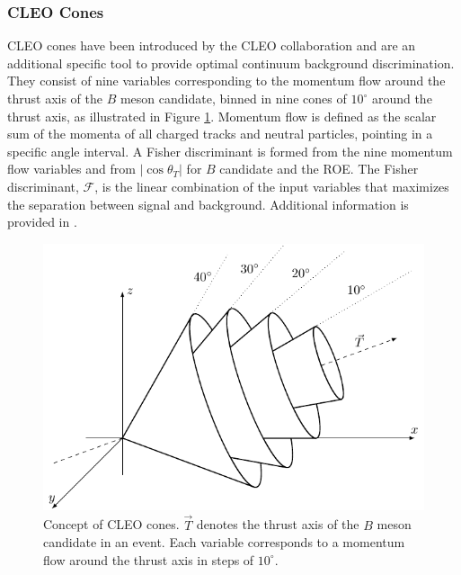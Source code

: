 \subsubsection{CLEO Cones}
CLEO cones have been introduced by the CLEO collaboration and are an additional specific tool to provide optimal continuum background discrimination. They consist of nine variables corresponding to the momentum flow around the thrust axis of the $B$ meson candidate, binned in nine cones of $10^\circ$ around the thrust axis, as illustrated in Figure \ref{fig:ccones}. Momentum flow is defined as the scalar sum of the momenta of all charged tracks and neutral particles, pointing in a specific angle interval. A Fisher discriminant is formed from the nine momentum flow variables and from $\vert \cos\theta_T\vert$ for $B$ candidate and the ROE. The Fisher discriminant, $\mathcal{F}$, is the linear combination of the input variables that maximizes the separation between signal and background. Additional information is provided in \cite{asner1996search}.

\begin{figure}[H]
	\centering
	\captionsetup{width=0.8\linewidth}
	\includegraphics[scale=1]{texfig/CCones}
	\caption{Concept of CLEO cones. $\vec{T}$ denotes the thrust axis of the $B$ meson candidate in an event. Each variable corresponds to a momentum flow around the thrust axis in steps of $10^\circ$.}
	\label{fig:ccones}
\end{figure}

